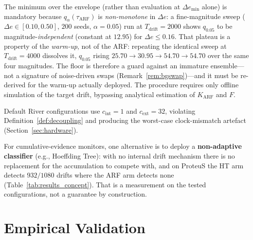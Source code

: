 \documentclass[smallextended]{svjour3}
\begin{document}
\begin{definition}
  The minimum over the envelope (rather than evaluation at $\Delta e_{\min}$ alone) is mandatory because $q_{\alpha}(\tau_{\mathrm{ARF}})$ is \emph{non-monotone} in $\Delta e$: a fine-magnitude sweep ($\Delta e \in [0.10,0.50]$, $200$ seeds, $\alpha = 0.05$) run at $T_{\mathrm{drift}} = 2000$ shows $q_{0.05}$ to be magnitude-\emph{independent} (constant at $12.95$) for $\Delta e \le 0.16$. That plateau is a property of the \emph{warm-up}, not of the ARF: repeating the identical sweep at $T_{\mathrm{drift}} = 4000$ dissolves it, $q_{0.05}$ rising $25.70 \to 30.95 \to 54.70 \to 54.70$ over the same four magnitudes. The floor is therefore a guard against an immature ensemble---not a signature of noise-driven swaps (Remark~\ref{rem:bgswap})---and it must be re-derived for the warm-up actually deployed. The procedure requires only offline simulation of the target drift, bypassing analytical estimation of $K_{\mathrm{ARF}}$ and $F$.
\end{definition}

Default River configurations use $c_{\mathrm{int}} = 1$ and $c_{\mathrm{ext}} = 32$, violating Definition~\ref{def:decoupling} and producing the worst-case clock-mismatch artefact (Section~\ref{sec:hardware}).

For cumulative-evidence monitors, one alternative is to deploy a \textbf{non-adaptive classifier} (e.g., Hoeffding Tree): with no internal drift mechanism there is no replacement for the accumulation to compete with, and on ProteuS the HT arm detects $932/1080$ drifts where the ARF arm detects none (Table~\ref{tab:results_concept}). That is a measurement on the tested configurations, not a guarantee by construction.



\section{Empirical Validation}\label{sec:experiments}
\end{document}

